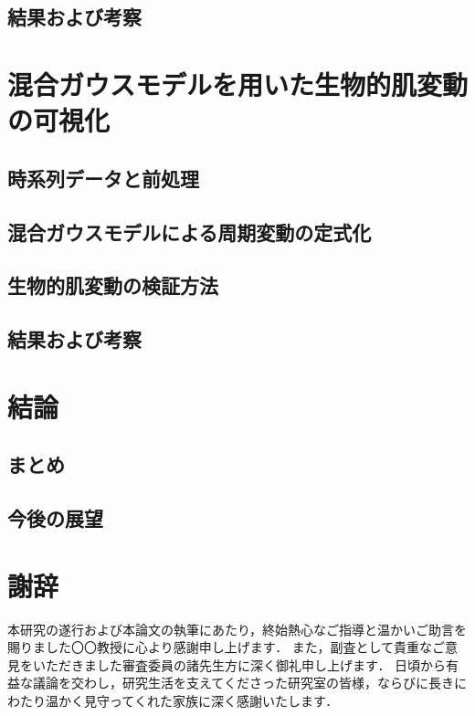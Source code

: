 \documentclass[book,paper=a4,fontsize=16pt,openany]{jlreq}
\begin{document}
\section{結果および考察}

\chapter{混合ガウスモデルを用いた生物的肌変動の可視化}
\section{時系列データと前処理}
\section{混合ガウスモデルによる周期変動の定式化}
\section{生物的肌変動の検証方法}
\section{結果および考察}

\chapter{結論}
\section{まとめ}
\section{今後の展望}

\backmatter

\chapter{謝辞}
本研究の遂行および本論文の執筆にあたり，終始熱心なご指導と温かいご助言を賜りました〇〇教授に心より感謝申し上げます．
また，副査として貴重なご意見をいただきました審査委員の諸先生方に深く御礼申し上げます．
日頃から有益な議論を交わし，研究生活を支えてくださった研究室の皆様，ならびに長きにわたり温かく見守ってくれた家族に深く感謝いたします．
\end{document}

